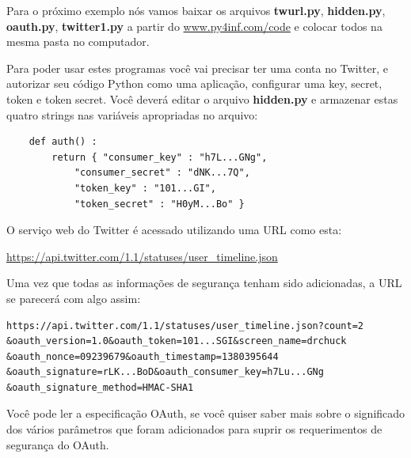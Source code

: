 Para o próximo exemplo nós vamos baixar os arquivos
{\bf twurl.py}, {\bf hidden.py}, {\bf oauth.py}, 
{\bf twitter1.py} a partir do 
\url{www.py4inf.com/code} e colocar todos na mesma pasta
no computador.

Para poder usar estes programas você vai precisar ter uma conta
no Twitter, e autorizar seu código Python como uma aplicação,
configurar uma key, secret, token e token secret. Você deverá 
editar o arquivo {\bf hidden.py} e armazenar
estas quatro strings nas variáveis apropriadas no arquivo:

\beforeverb
\begin{verbatim}
    def auth() :
        return { "consumer_key" : "h7L...GNg",
            "consumer_secret" : "dNK...7Q",
            "token_key" : "101...GI",
            "token_secret" : "H0yM...Bo" }
\end{verbatim}
\afterverb

O serviço web do Twitter é acessado utilizando uma URL como esta:

\url{https://api.twitter.com/1.1/statuses/user_timeline.json}

Uma vez que todas as informações de segurança tenham sido adicionadas,
a URL se parecerá com algo assim:

\beforeverb
\begin{verbatim}
https://api.twitter.com/1.1/statuses/user_timeline.json?count=2
&oauth_version=1.0&oauth_token=101...SGI&screen_name=drchuck
&oauth_nonce=09239679&oauth_timestamp=1380395644
&oauth_signature=rLK...BoD&oauth_consumer_key=h7Lu...GNg
&oauth_signature_method=HMAC-SHA1
\end{verbatim}
\afterverb
%
Você pode ler a especificação OAuth, se você quiser saber mais
sobre o significado dos vários parâmetros que foram adicionados
para suprir os requerimentos de segurança do OAuth.

